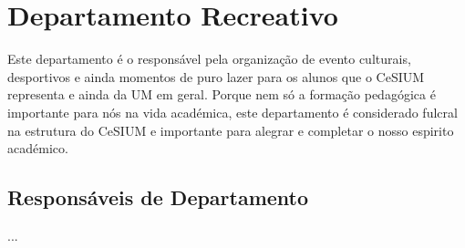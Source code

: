 \section{Departamento Recreativo}

\indent Este departamento é o responsável pela organização de evento culturais, desportivos e ainda momentos de puro lazer para os alunos que o CeSIUM representa e ainda da UM em geral. Porque nem só a formação pedagógica é importante para nós na vida académica, este departamento é considerado fulcral na estrutura do CeSIUM e importante para alegrar e completar o nosso espirito académico.

\subsection{Responsáveis de Departamento}
\begin{itemizedash}
	\item ...
\end{itemizedash}

